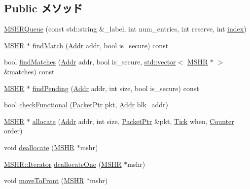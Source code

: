 \subsection*{Public メソッド}
\begin{DoxyCompactItemize}
\item 
\hyperlink{classMSHRQueue_a72708efb7b001e844259a19264e0f275}{MSHRQueue} (const std::string \&\_\-label, int num\_\-entries, int reserve, int \hyperlink{classMSHRQueue_a32b76ccceab9e1bba3e8c4ef2947d1d8}{index})
\item 
\hyperlink{classMSHR}{MSHR} $\ast$ \hyperlink{classMSHRQueue_aab842d63dcd254dfe655e16075f7e0fe}{findMatch} (\hyperlink{base_2types_8hh_af1bb03d6a4ee096394a6749f0a169232}{Addr} addr, bool is\_\-secure) const 
\item 
bool \hyperlink{classMSHRQueue_a020dd5bb628863baf3800f816cfba197}{findMatches} (\hyperlink{base_2types_8hh_af1bb03d6a4ee096394a6749f0a169232}{Addr} addr, bool is\_\-secure, \hyperlink{classstd_1_1vector}{std::vector}$<$ \hyperlink{classMSHR}{MSHR} $\ast$ $>$ \&matches) const 
\item 
\hyperlink{classMSHR}{MSHR} $\ast$ \hyperlink{classMSHRQueue_affbbf09e05a34a8c06a00eeb8425be92}{findPending} (\hyperlink{base_2types_8hh_af1bb03d6a4ee096394a6749f0a169232}{Addr} addr, int size, bool is\_\-secure) const 
\item 
bool \hyperlink{classMSHRQueue_ab1a1044e709a5b00c99cf14430b3ff53}{checkFunctional} (\hyperlink{classPacket}{PacketPtr} pkt, \hyperlink{base_2types_8hh_af1bb03d6a4ee096394a6749f0a169232}{Addr} blk\_\-addr)
\item 
\hyperlink{classMSHR}{MSHR} $\ast$ \hyperlink{classMSHRQueue_a5215a381ac6546c5ef5730b060b38e61}{allocate} (\hyperlink{base_2types_8hh_af1bb03d6a4ee096394a6749f0a169232}{Addr} addr, int size, \hyperlink{classPacket}{PacketPtr} \&pkt, \hyperlink{base_2types_8hh_a5c8ed81b7d238c9083e1037ba6d61643}{Tick} when, \hyperlink{base_2types_8hh_ae1475755791765b8e6f6a8bb091e273e}{Counter} order)
\item 
void \hyperlink{classMSHRQueue_a1704942edaee695477bdfc7598bd8ad7}{deallocate} (\hyperlink{classMSHR}{MSHR} $\ast$mshr)
\item 
\hyperlink{classMSHR_af944263ff3027ab76cf07354d3a3f0c6}{MSHR::Iterator} \hyperlink{classMSHRQueue_a8a69fab976c144c9128fec59358d3196}{deallocateOne} (\hyperlink{classMSHR}{MSHR} $\ast$mshr)
\item 
void \hyperlink{classMSHRQueue_a2a53c836e41157cdbf2c19b6fd30e276}{moveToFront} (\hyperlink{classMSHR}{MSHR} $\ast$mshr)

\end{DoxyCompactItemize}
